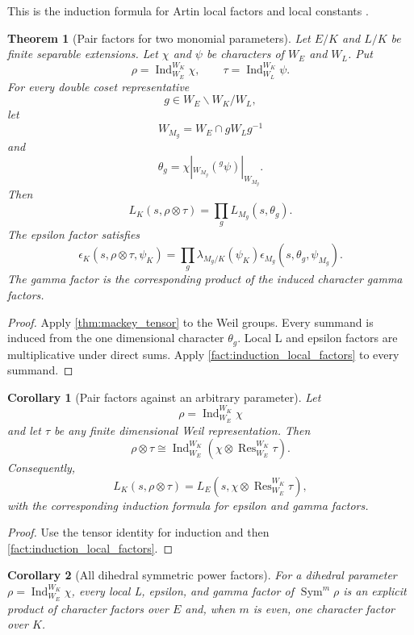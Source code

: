 \documentclass{aomart}
\newtheorem{theorem}{Theorem}[section]
\newtheorem{corollary}[corollary]{Corollary}
\theoremstyle{definition}
\theoremstyle{remark}
\newcommand{\Ind}{\operatorname{Ind}}
\newcommand{\Res}{\operatorname{Res}}
\newcommand{\Sym}{\operatorname{Sym}}
\begin{document}
This is the induction formula for Artin local factors and local constants \cite{Deligne1973,Tate1979}.

\begin{theorem}[Pair factors for two monomial parameters]\label{thm:monomial_pair_factors}
Let \(E/K\) and \(L/K\) be finite separable extensions. Let \(\chi\) and \(\psi\) be characters of \(W_E\) and \(W_L\). Put
\[
\rho=\Ind_{W_E}^{W_K}\chi,
\qquad
\tau=\Ind_{W_L}^{W_K}\psi.
\]
For every double coset representative
\[
g\in W_E\backslash W_K/W_L,
\]
let
\[
W_{M_g}
=
W_E\cap gW_Lg^{-1}
\]
and
\[
\theta_g
=
\chi|_{W_{M_g}}
({}^g\psi)|_{W_{M_g}}.
\]
Then
\[
\boxed{
L_K(s,\rho\otimes\tau)
=
\prod_g
L_{M_g}(s,\theta_g).
}
\]
The epsilon factor satisfies
\[
\boxed{
\epsilon_K(s,\rho\otimes\tau,\psi_K)
=
\prod_g
\lambda_{M_g/K}(\psi_K)
\epsilon_{M_g}(s,\theta_g,\psi_{M_g}).
}
\]
The gamma factor is the corresponding product of the induced character gamma factors.
\end{theorem}

\begin{proof}
Apply \cref{thm:mackey_tensor} to the Weil groups. Every summand is induced from the one dimensional character \(\theta_g\). Local L and epsilon factors are multiplicative under direct sums. Apply \cref{fact:induction_local_factors} to every summand.
\end{proof}

\begin{corollary}[Pair factors against an arbitrary parameter]\label{cor:arbitrary_pair_reduction}
Let
\[
\rho=\Ind_{W_E}^{W_K}\chi
\]
and let \(\tau\) be any finite dimensional Weil representation. Then
\[
\boxed{
\rho\otimes\tau
\cong
\Ind_{W_E}^{W_K}
\left(
\chi\otimes\Res_{W_E}^{W_K}\tau
\right).
}
\]
Consequently,
\[
L_K(s,\rho\otimes\tau)
=
L_E
\left(
 s,
 \chi\otimes\Res_{W_E}^{W_K}\tau
\right),
\]
with the corresponding induction formula for epsilon and gamma factors.
\end{corollary}

\begin{proof}
Use the tensor identity for induction and then \cref{fact:induction_local_factors}.
\end{proof}

\begin{corollary}[All dihedral symmetric power factors]\label{cor:dihedral_symmetric_factors}
For a dihedral parameter \(\rho=\Ind_{W_E}^{W_K}\chi\), every local L, epsilon, and gamma factor of \(\Sym^m\rho\) is an explicit product of character factors over \(E\) and, when \(m\) is even, one character factor over \(K\).
\end{corollary}
\end{document}

